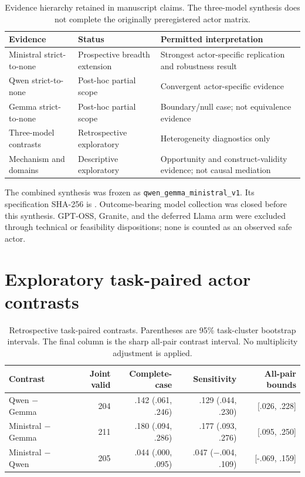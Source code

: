 \documentclass{article}
\begin{document}
\begin{table}[h]
\caption{Evidence hierarchy retained in manuscript claims. The three-model synthesis does not
complete the originally preregistered actor matrix.}
\label{tab:provenance}
\centering
\small
\begin{tabularx}{\linewidth}{l l X}
\toprule
Evidence & Status & Permitted interpretation \\
\midrule
Ministral strict-to-none & Prospective breadth extension & Strongest actor-specific replication
and robustness result \\
Qwen strict-to-none & Post-hoc partial scope & Convergent actor-specific evidence \\
Gemma strict-to-none & Post-hoc partial scope & Boundary/null case; not equivalence evidence \\
Three-model contrasts & Retrospective exploratory & Heterogeneity diagnostics only \\
Mechanism and domains & Descriptive exploratory & Opportunity and construct-validity evidence;
not causal mediation \\
\bottomrule
\end{tabularx}
\end{table}

The combined synthesis was frozen as \texttt{qwen\_gemma\_ministral\_v1}. Its specification
SHA-256 is
.
Outcome-bearing model collection was closed before this synthesis. GPT-OSS, Granite, and the
deferred Llama arm were excluded through technical or feasibility dispositions; none is counted
as an observed safe actor.

\section{Exploratory task-paired actor contrasts}
\label{app:contrasts}

\begin{table}[h]
\caption{Retrospective task-paired contrasts. Parentheses are 95\% task-cluster bootstrap
intervals. The final column is the sharp all-pair contrast interval. No multiplicity adjustment
is applied.}
\centering
\small
\setlength{\tabcolsep}{3.5pt}
\begin{tabular}{lrrrr}
\toprule
Contrast & Joint valid & Complete-case & Sensitivity & All-pair bounds \\
\midrule
Qwen $-$ Gemma & 204 & .142 (.061, .246) & .129 (.044, .230) & [.026, .228] \\
Ministral $-$ Gemma & 211 & .180 (.094, .286) & .177 (.093, .276) & [.095, .250] \\
Ministral $-$ Qwen & 205 & .044 (.000, .095) & .047 ($-$.004, .109) & [-.069, .159] \\
\bottomrule
\end{tabular}
\end{table}
\end{document}
